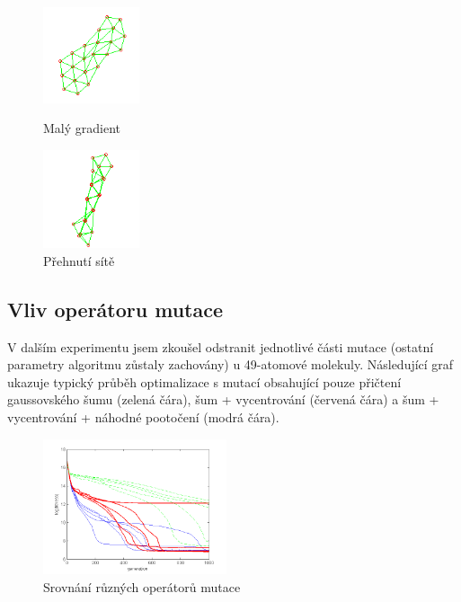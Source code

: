 \documentclass[journal]{IEEEtrancz}
\begin{document}
\begin{figure}[h]
        \begin{minipage}[l]{0.22\textwidth}
            \includegraphics[width = 80pt]{lokmin.png}
            \caption{Malý gradient}
            \label{obr:grad}
        \end{minipage}
        \begin{minipage}[r]{0.22\textwidth}
            \includegraphics[width = 80pt]{prehnute.png}
            \caption{Přehnutí sítě}  
        \end{minipage}
\end{figure}


\subsection{Vliv operátoru mutace}
V dalším experimentu jsem zkoušel odstranit jednotlivé části mutace (ostatní parametry algoritmu zůstaly zachovány) u 49-atomové molekuly. Následující graf ukazuje typický průběh optimalizace s mutací obsahující pouze přičtení gaussovského šumu (zelená čára), šum + vycentrování (červená čára) a šum + vycentrování + náhodné pootočení (modrá čára).

\begin{figure}[h]
    \includegraphics[width = 0.48\textwidth]{vse.png}
    \caption{Srovnání různých operátorů mutace}
\end{figure}
\end{document}
